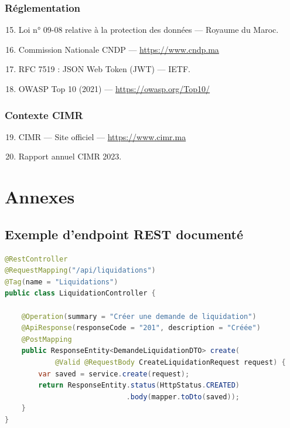 \documentclass[12pt,a4paper,oneside]{report}
\begin{document}
\subsection*{Réglementation}
\begin{enumerate}\setcounter{enumi}{14}
    \item Loi n° 09-08 relative à la protection des données --- Royaume du Maroc.
    \item Commission Nationale CNDP --- \url{https://www.cndp.ma}
    \item RFC 7519 : JSON Web Token (JWT) --- IETF.
    \item OWASP Top 10 (2021) --- \url{https://owasp.org/Top10/}
\end{enumerate}

\subsection*{Contexte CIMR}
\begin{enumerate}\setcounter{enumi}{18}
    \item CIMR --- Site officiel --- \url{https://www.cimr.ma}
    \item Rapport annuel CIMR 2023.
\end{enumerate}

\appendix
\chapter{Annexes}

\section{Exemple d'endpoint REST documenté}
\begin{lstlisting}[language=Java]
@RestController
@RequestMapping("/api/liquidations")
@Tag(name = "Liquidations")
public class LiquidationController {

    @Operation(summary = "Créer une demande de liquidation")
    @ApiResponse(responseCode = "201", description = "Créée")
    @PostMapping
    public ResponseEntity<DemandeLiquidationDTO> create(
            @Valid @RequestBody CreateLiquidationRequest request) {
        var saved = service.create(request);
        return ResponseEntity.status(HttpStatus.CREATED)
                             .body(mapper.toDto(saved));
    }
}
\end{lstlisting}
\end{document}
